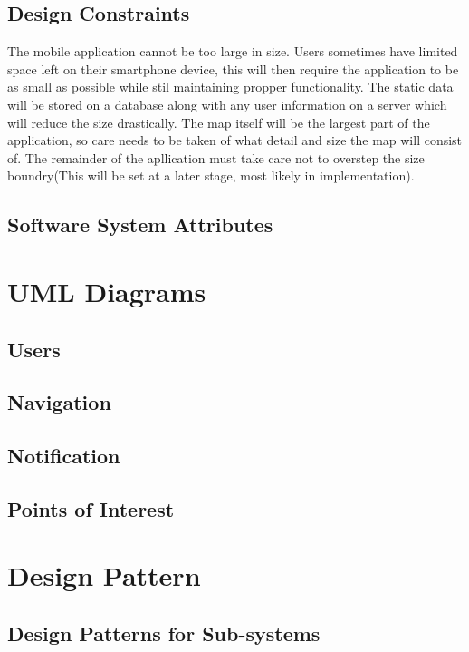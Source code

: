 \documentclass{article}
\begin{document}
	\subsection{Design Constraints}
The mobile application cannot be too large in size. Users sometimes have limited space left on their smartphone device, this will then require the application to be as small as possible while stil maintaining propper functionality. The static data will be stored on a database along with any user information on a server which will reduce the size drastically. The map itself will be the largest part of the application, so care needs to be taken of what detail and size the map will consist of. The remainder of the apllication must take care not to overstep the size boundry(This will be set at a later stage, most likely in implementation).
	\subsection{Software System Attributes}

\section{UML Diagrams}
	\subsection{Users}
	
	\subsection{Navigation}
	
	\subsection{Notification}
	
	\subsection{Points of Interest}

\section{Design Pattern}
	\subsection{Design Patterns for Sub-systems}
	
\end{document}
